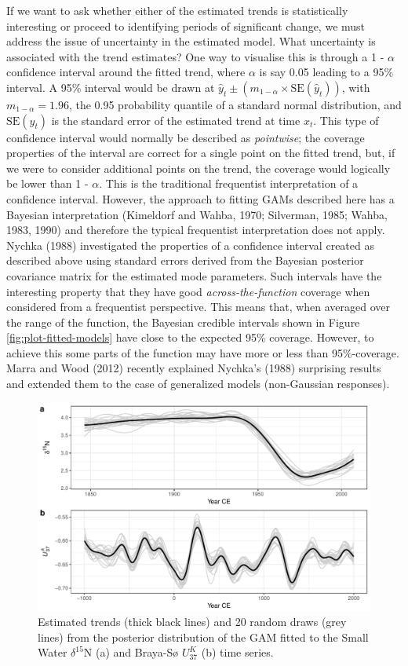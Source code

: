 \documentclass[12pt,]{article}
\newcommand{\uk}{\ensuremath{\mathit{U}^{\mathit{K}}_{\mathup{37}}}}
\begin{document}
If we want to ask whether either of the estimated trends is
statistically interesting or proceed to identifying periods of
significant change, we must address the issue of uncertainty in the
estimated model. What uncertainty is associated with the trend
estimates? One way to visualise this is through a 1 - \(\alpha\)
confidence interval around the fitted trend, where \(\alpha\) is say
0.05 leading to a 95\% interval. A 95\% interval would be drawn at
\(\hat{y}_t \pm (m_{1-\alpha} \times \text{SE}(\hat{y}_t))\), with
\(m_{1-\alpha} = 1.96\), the 0.95 probability quantile of a standard
normal distribution, and \(\text{SE}(\hat{y}_t)\) is the standard error
of the estimated trend at time \(x_t\). This type of confidence interval
would normally be described as \emph{pointwise}; the coverage properties
of the interval are correct for a single point on the fitted trend, but,
if we were to consider additional points on the trend, the coverage
would logically be lower than 1 - \(\alpha\). This is the traditional
frequentist interpretation of a confidence interval. However, the
approach to fitting GAMs described here has a Bayesian interpretation
(Kimeldorf and Wahba, 1970; Silverman, 1985; Wahba, 1983, 1990) and
therefore the typical frequentist interpretation does not apply. Nychka
(1988) investigated the properties of a confidence interval created as
described above using standard errors derived from the Bayesian
posterior covariance matrix for the estimated mode parameters. Such
intervals have the interesting property that they have good
\emph{across-the-function} coverage when considered from a frequentist
perspective. This means that, when averaged over the range of the
function, the Bayesian credible intervals shown in Figure
\ref{fig:plot-fitted-models} have close to the expected 95\% coverage.
However, to achieve this some parts of the function may have more or
less than 95\%-coverage. Marra and Wood (2012) recently explained
Nychka's (1988) surprising results and extended them to the case of
generalized models (non-Gaussian responses).

\begin{figure}

{\centering \includegraphics[width=0.8\linewidth]{manuscript_files/figure-latex/posterior-simulation-1} 

}

\caption{Estimated trends (thick black lines) and 20 random draws (grey lines) from the posterior distribution of the GAM fitted to the Small Water $\delta^{15}\text{N}$ (a) and Braya-Sø \uk{} (b) time series.}\label{fig:posterior-simulation}
\end{figure}
\end{document}
